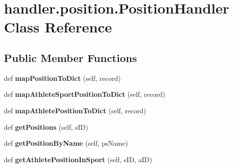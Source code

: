 \hypertarget{classhandler_1_1position_1_1_position_handler}{}\section{handler.\+position.\+Position\+Handler Class Reference}
\label{classhandler_1_1position_1_1_position_handler}
\subsection*{Public Member Functions}
\begin{DoxyCompactItemize}
\item 
\mbox{\label{classhandler_1_1position_1_1_position_handler_a354791b1befe44252c11a08d66946cb1}} 
def {\bfseries map\+Position\+To\+Dict} (self, record)
\item 
\mbox{\label{classhandler_1_1position_1_1_position_handler_ad4c25f3b3416a8e998e2f20399be0374}} 
def {\bfseries map\+Athlete\+Sport\+Position\+To\+Dict} (self, record)
\item 
\mbox{\label{classhandler_1_1position_1_1_position_handler_a010682813c4072893a22298a478fef55}} 
def {\bfseries map\+Athlete\+Position\+To\+Dict} (self, record)
\item 
\mbox{\label{classhandler_1_1position_1_1_position_handler_a0fc832241f534a0e287a5d5b9329d745}} 
def {\bfseries get\+Positions} (self, s\+ID)
\item 
\mbox{\label{classhandler_1_1position_1_1_position_handler_aa782887eabaae2dd536b5e258b6d9d83}} 
def {\bfseries get\+Position\+By\+Name} (self, ps\+Name)
\item 
\mbox{\label{classhandler_1_1position_1_1_position_handler_a8f2e78eb3210d508f03495f76ac8041f}} 
def {\bfseries get\+Athlete\+Position\+In\+Sport} (self, s\+ID, a\+ID)
\item 
\mbox{\label{classhandler_1_1position_1_1_position_handler_a362ec35d2bfc0d1d332e817235932514}} 

\end{DoxyCompactItemize}

